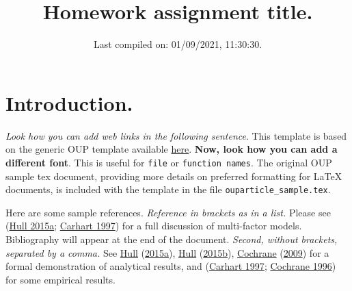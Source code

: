 \documentclass[12pt,halfline,a4paper,]{ouparticle}
\begin{document}
\title{\textbf{Homework assignment title.}}

\author{%
\address{778899}
\and
{}\address{774455}
\and
{}\address{884422}
\and
{}
}


\date{Last compiled on: 01/09/2021, 11:30:30.}


\maketitle



\hypersetup{linkcolor=blue}

\hypertarget{introduction.}{%
\section{Introduction.}\label{introduction.}}

\emph{Look how you can add web links in the following sentence}. This
template is based on the generic OUP template available
\href{https://academic.oup.com/icesjms/pages/General_Instructions}{here}.
\textbf{Now, look how you can add a different font}. This is useful for
\texttt{file} or \texttt{function names}. The original OUP sample tex
document, providing more details on preferred formatting for LaTeX
documents, is included with the template in the file
\texttt{ouparticle\_sample.tex}.

Here are some sample references. \emph{Reference in brackets as in a
list.} Please see (\protect\hyperlink{ref-Hull}{Hull 2015a};
\protect\hyperlink{ref-carhart1997persistence}{Carhart 1997}) for a full
discussion of multi-factor models. Bibliography will appear at the end
of the document. \emph{Second, without brackets, separated by a comma.}
See \protect\hyperlink{ref-Hull}{Hull}
(\protect\hyperlink{ref-Hull}{2015a}),
\protect\hyperlink{ref-Hull2}{Hull}
(\protect\hyperlink{ref-Hull2}{2015b}),
\protect\hyperlink{ref-cochrane2009asset}{Cochrane}
(\protect\hyperlink{ref-cochrane2009asset}{2009}) for a formal
demonstration of analytical results, and
(\protect\hyperlink{ref-carhart1997persistence}{Carhart 1997};
\protect\hyperlink{ref-cochrane1996cross}{Cochrane 1996}) for some
empirical results.
\end{document}
